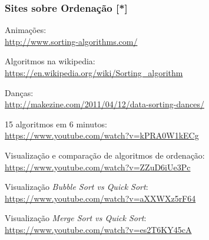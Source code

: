 \documentclass[aspectratio=169]{beamer}
\begin{document}
\begin{frame}\frametitle{Sites sobre Ordenação [*]}
\begin{itemize}
{\small
	\item Animações:\\\url{http://www.sorting-algorithms.com/}
	\item Algoritmos na wikipedia:\\\url {https://en.wikipedia.org/wiki/Sorting_algorithm}
	\item Danças:\\\url{http://makezine.com/2011/04/12/data-sorting-dances/}
	\item 15 algoritmos em 6 minutos:\\\url{https://www.youtube.com/watch?v=kPRA0W1kECg}
	\item Visualização e comparação de algoritmos de ordenação:\\\url{https://www.youtube.com/watch?v=ZZuD6iUe3Pc}
	\item Visualização \emph{Bubble Sort vs Quick Sort}:\\\url{https://www.youtube.com/watch?v=aXXWXz5rF64}
	\item Visualização \emph{Merge Sort vs Quick Sort}:\\\url{https://www.youtube.com/watch?v=es2T6KY45cA}
}
\end{itemize}
\end{frame}
\end{document}
